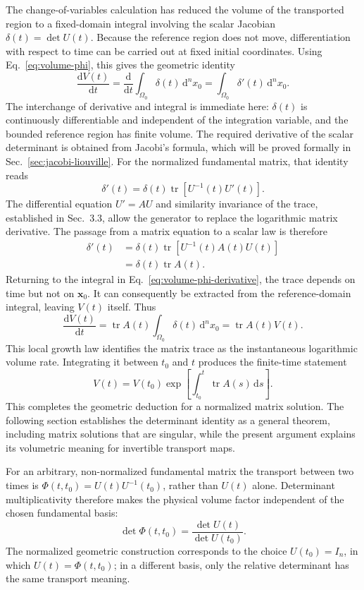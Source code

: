 \documentclass[11pt,a4paper]{article}
\newcommand{\be}{\begin{equation}}
\newcommand{\ee}{\end{equation}}
\newcommand{\lb}[1]{\label{#1}}
\newcommand{\dd}{\mathrm{d}}
\DeclareMathOperator{\tr}{tr}
\theoremstyle{definition}
\numberwithin{equation}{section}
\begin{document}
The change-of-variables calculation has reduced the volume of the transported region to a fixed-domain integral involving the scalar Jacobian $\delta(t)=\det U(t)$. Because the reference region does not move, differentiation with respect to time can be carried out at fixed initial coordinates. Using Eq.~\eqref{eq:volume-phi}, this gives the geometric identity
\be
\frac{\dd V(t)}{\dd t}
=\frac{\dd}{\dd t}\int_{\Omega_0}\delta(t)\,\dd^n x_0
=\int_{\Omega_0}\delta'(t)\,\dd^n x_0.
\lb{eq:volume-phi-derivative}
\ee
The interchange of derivative and integral is immediate here: $\delta(t)$ is continuously differentiable and independent of the integration variable, and the bounded reference region has finite volume. The required derivative of the scalar determinant is obtained from Jacobi's formula, which will be proved formally in Sec.~\ref{sec:jacobi-liouville}. For the normalized fundamental matrix, that identity reads
\be
\delta'(t)=\delta(t)\tr\left[U^{-1}(t)U'(t)\right].
\lb{eq:phi-jacobi-preview}
\ee
The differential equation $U'=AU$ and similarity invariance of the trace, established in Sec.~3.3, allow the generator to replace the logarithmic matrix derivative. The passage from a matrix equation to a scalar law is therefore
\be
\begin{aligned}
\delta'(t)
&=\delta(t)\tr\left[U^{-1}(t)A(t)U(t)\right]\\
&=\delta(t)\tr A(t).
\end{aligned}
\lb{eq:phi-trace-preview}
\ee
Returning to the integral in Eq.~\eqref{eq:volume-phi-derivative}, the trace depends on time but not on $\mathbf{x}_0$. It can consequently be extracted from the reference-domain integral, leaving $V(t)$ itself. Thus
\be
\frac{\dd V(t)}{\dd t}
=\tr A(t)\int_{\Omega_0}\delta(t)\,\dd^n x_0
=\tr A(t)V(t).
\lb{eq:volume-rate-preview}
\ee
This local growth law identifies the matrix trace as the instantaneous logarithmic volume rate. Integrating it between $t_0$ and $t$ produces the finite-time statement
\be
V(t)
=V(t_0)\exp\left[\int_{t_0}^{t}\tr A(s)\,\dd s\right].
\lb{eq:geo-volume-integrated}
\ee
This completes the geometric deduction for a normalized matrix solution. The following section establishes the determinant identity as a general theorem, including matrix solutions that are singular, while the present argument explains its volumetric meaning for invertible transport maps.

For an arbitrary, non-normalized fundamental matrix the transport between two times is $\Phi(t,t_0)=U(t)U^{-1}(t_0)$, rather than $U(t)$ alone. Determinant multiplicativity therefore makes the physical volume factor independent of the chosen fundamental basis:
\be
\det\Phi(t,t_0)=\frac{\det U(t)}{\det U(t_0)}.
\lb{eq:geo-det-transition}
\ee
The normalized geometric construction corresponds to the choice $U(t_0)=I_n$, in which $U(t)=\Phi(t,t_0)$; in a different basis, only the relative determinant has the same transport meaning.
\end{document}
